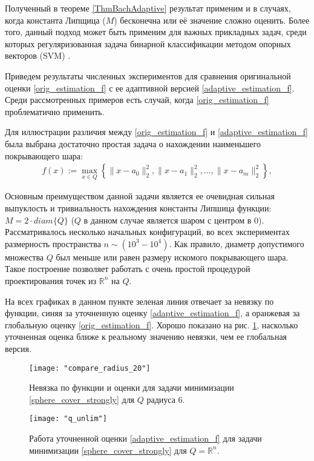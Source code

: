 Полученный в теореме \ref{ThmBachAdaptive} результат применим и в случаях, когда константа Липщица ($M$) бесконечна или её значение сложно оценить. Более того, данный подход может быть применим для важных прикладных задач, среди которых регуляризованная задача бинарной классификации методом опорных векторов (SVM) \cite{Bach_2012}. 

Приведем результаты численных экспериментов для сравнения оригинальной оценки \eqref{orig_estimation_f} с ее адаптивной версией \eqref{adaptive_estimation_f}. Среди рассмотренных примеров есть случай, когда \eqref{orig_estimation_f} проблематично применить. 

Для иллюстрации различия между \eqref{orig_estimation_f} и \eqref{adaptive_estimation_f} была выбрана достаточно простая задача о нахождении наименьшего покрывающего шара:
\begin{gather}\label{sphere_cover_strongly}
    f(x) := \max_{x\in Q}\left\{\|x - a_0\|_2^2, \|x - a_1\|_2^2, ..., \|x - a_m\|_2^2\right\},
\end{gather}

Основным преимуществом данной задачи является ее очевидная сильная выпуклость и тривиальность нахождения константы Липшица функции: $ M = 2 \cdot diam\{Q\} $ ($Q$ в данном случае является шаром с центром в 0).
Рассматривалось несколько начальных конфигураций, во всех экспериментах размерность пространства $n \sim (10^3 - 10^4)$. Как правило, диаметр допустимого множества $Q$ был меньше или равен размеру искомого покрывающего шара. Такое построение позволяет работать с очень простой процедурой проектирования точек из $\mathbb{R}^n$ на $Q$.

На всех графиках в данном пункте зеленая линия отвечает за невязку по функции, синяя за уточненную оценку \eqref{adaptive_estimation_f}, а оранжевая за глобальную оценку \eqref{orig_estimation_f}. Хорошо показано на рис. \ref{r_20_q_6}, насколько уточненная оценка ближе к реальному значению невязки, чем ее глобальная версия. 

\begin{figure}[h]
	\centering
	\texttt{[image: "compare\_radius\_20"]}
    \caption{Невязка по функции и оценки для задачи минимизации \eqref{sphere_cover_strongly} для $Q$ радиуса 6.}
    \label{r_20_q_6}
\end{figure}

\begin{figure}[h]
	\centering
	\texttt{[image: "q\_unlim"]}
    \caption{Работа уточненной оценки \eqref{adaptive_estimation_f} для задачи минимизации \eqref{sphere_cover_strongly} для $Q = \mathbb{R}^n$.}
    \label{q_unlim}
\end{figure}

